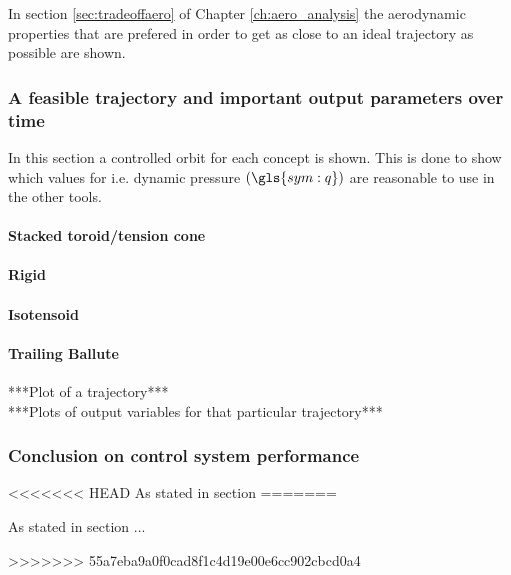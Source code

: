 In section \ref{sec:tradeoffaero} of Chapter \ref{ch:aero_analysis} the aerodynamic properties that are prefered in order to get as close to an ideal trajectory as possible are shown.

\subsubsection{A feasible trajectory and important output parameters over time}
\label{sec:astrorestraj}

In this section a controlled orbit for each concept is shown. This is done to show which values for i.e. dynamic pressure $\left(\gls{sym:q}\right)$ are reasonable to use in the other tools.

\paragraph{Stacked toroid/tension cone}

\paragraph{Rigid}

\paragraph{Isotensoid}

\paragraph{Trailing Ballute}

***Plot of a trajectory***\\
***Plots of output variables for that particular trajectory***\\

\subsubsection{Conclusion on control system performance}
\label{sec:conclusion}
<<<<<<< HEAD
As stated in section 
=======

As stated in section ...


>>>>>>> 55a7eba9a0f0cad8f1c4d19e00e6cc902cbcd0a4
